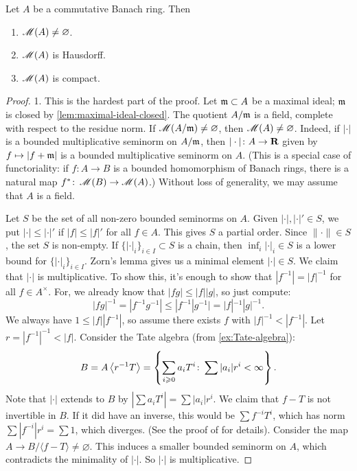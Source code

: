 \begin{theorem}
Let $A$ be a commutative Banach ring. Then 
\begin{enumerate}
\item
$\operatorname{\mathscr{M}}(A)\ne\varnothing$. 

\item
$\operatorname{\mathscr{M}}(A)$ is Hausdorff. 

\item
$\operatorname{\mathscr{M}}(A)$ is compact. 
\end{enumerate}
\end{theorem}
\begin{proof}
1. This is the hardest part of the proof. Let $\mathfrak{m}\subset A$ be a maximal 
ideal; $\mathfrak{m}$ is closed by \autoref{lem:maximal-ideal-closed}. The quotient 
$A/\mathfrak{m}$ is a field, complete with respect to the residue norm. If 
$\operatorname{\mathscr{M}}(A/\mathfrak{m})\ne\varnothing$, then $\operatorname{\mathscr{M}}(A)\ne\varnothing$. Indeed, 
if $|\cdot|$ is a bounded multiplicative seminorm on $A/\mathfrak{m}$, then 
$|\cdot|\colon A\to \mathbf{R}$ given by $f\mapsto |f+\mathfrak{m}|$ is a bounded 
multiplicative seminorm on $A$. (This is a special case of functoriality: if 
$f\colon A\to B$ is a bounded homomorphism of Banach rings, there is a natural 
map $f^\ast\colon \operatorname{\mathscr{M}}(B)\to \operatorname{\mathscr{M}}(A)$.) Without loss of generality, 
we may assume that $A$ is a field. 

Let $S$ be the set of all non-zero bounded seminorms on $A$. Given 
$|\cdot|,|\cdot|'\in S$, we put $|\cdot|\leqslant |\cdot|'$ if 
$|f|\leqslant |f|'$ for all $f\in A$. This gives $S$ a partial order. Since 
$\|\cdot\|\in S$, the set $S$ is non-empty. If 
$\{|\cdot|_i\}_{i\in I}\subset S$ is a chain, then $\inf_i |\cdot|_i\in S$ is 
a lower bound for $\{|\cdot|_i\}_{i\in I}$. Zorn's lemma gives us a minimal 
element $|\cdot|\in S$. We claim that 
$|\cdot|$ is multiplicative. To show this, it's enough to show that 
$|f^{-1}| = |f|^{-1}$ for all $f\in A^\times$. For, we already know that 
$|f g|\leqslant |f| |g|$, so just compute:
\[
  |f g|^{-1} = |f^{-1} g^{-1}| \leqslant |f^{-1} |g^{-1}| = |f|^{-1} |g|^{-1} .
\]
We always have $1\leqslant |f| |f^{-1}|$, so assume there exists $f$ with 
$|f|^{-1}<|f^{-1}|$. Let $r=|f^{-1}|^{-1}<|f|$. Consider the 
Tate algebra (from \autoref{ex:Tate-algebra}):
\[
  B = A\left\langle r^{-1} T \right\rangle = \left\{\sum_{i\geqslant 0} a_i T^i\colon \sum |a_i| r^i < \infty\right\} .
\]
Note that $|\cdot|$ extends to $B$ by $|\sum a_i T^i| = \sum |a_i| r^i$. We 
claim that $f-T$ is not invertible in $B$. If it did have an inverse, this 
would be $\sum f^{-i} T^i$, which has norm $\sum |f^{-i}| r^i = \sum 1$, which 
diverges. (See the proof of \cite[1.2.1]{berkovich-1990} for details). Consider 
the map $A\to B/\langle f-T\rangle\ne\varnothing$. This induces a smaller 
bounded seminorm on $A$, which contradicts the minimality of $|\cdot|$. So 
$|\cdot|$ is multiplicative. 


\end{proof}
